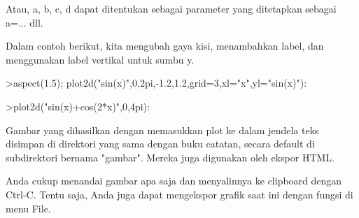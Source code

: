 \documentclass{article}
\begin{document}
\begin{eulernotebook}
\begin{eulercomment}
\begin{eulercomment}
\begin{eulercomment}
\begin{eulercomment}
\begin{eulercomment}
Atau, a, b, c, d dapat ditentukan sebagai parameter yang ditetapkan
sebagai a=... dll.

Dalam contoh berikut, kita mengubah gaya kisi, menambahkan label, dan
menggunakan label vertikal untuk sumbu y.
\end{eulercomment}
\begin{eulerprompt}
>aspect(1.5); plot2d("sin(x)",0,2pi,-1.2,1.2,grid=3,xl="x",yl="sin(x)"):
\end{eulerprompt}
\begin{eulerprompt}
>plot2d("sin(x)+cos(2*x)",0,4pi):
\end{eulerprompt}
\begin{eulercomment}
Gambar yang dihasilkan dengan memasukkan plot ke dalam jendela teks
disimpan di direktori yang sama dengan buku catatan, secara default di
subdirektori bernama "gambar". Mereka juga digunakan oleh ekspor HTML.

Anda cukup menandai gambar apa saja dan menyalinnya ke clipboard
dengan Ctrl-C. Tentu saja, Anda juga dapat mengekspor grafik saat ini
dengan fungsi di menu File.


\end{eulercomment}
\end{eulercomment}
\end{eulercomment}
\end{eulercomment}
\end{eulercomment}
\end{eulernotebook}
\end{document}
